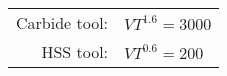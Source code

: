 \begin{tabular}{rl}
        Carbide tool: & $VT^{1.6}=3000$ \\
        HSS tool: & $VT^{0.6}=200$ \\
    \end{tabular}
